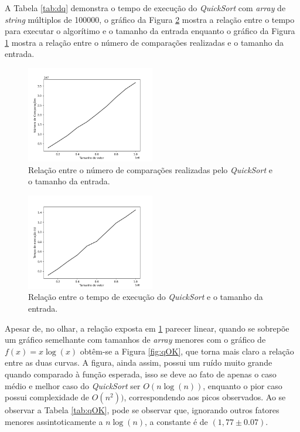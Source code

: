 \documentclass[12pt,a4paper,oneside]{article}
\begin{document}
\quad A Tabela \ref{tab:dq} demonstra o tempo de execução do \textit{QuickSort} com \textit{array} de \textit{string} múltiplos de 100000, o gráfico da Figura \ref{fig:tq} mostra a relação entre o tempo para executar o algorítimo e o tamanho da entrada enquanto o gráfico da Figura \ref{fig:nq} mostra a relação entre o número de comparações realizadas e o tamanho da entrada.

\begin{figure}[H]
\begin{center}
    \includegraphics[width=0.5\textwidth]{FigNQ.png} 
\end{center}
\caption{Relação entre o número de comparações realizadas pelo \textit{QuickSort} e o tamanho da entrada.}
\label{fig:nq}
\end{figure}

\begin{figure}[H]
\begin{center}
    \includegraphics[width=0.5\textwidth]{FigTQ.png} 
\end{center}
\caption{Relação entre o tempo de execução do \textit{QuickSort} e o tamanho da entrada.}
\label{fig:tq}
\end{figure}

\quad Apesar de, no olhar, a relação exposta em \ref{fig:nq} parecer linear, quando se sobrepõe um gráfico semelhante com tamanhos de \textit{array} menores com o gráfico de $f(x)=x\log{(x)}$ obtêm-se a Figura \ref{fig:qOK}, que torna mais claro a relação entre as duas curvas. A figura, ainda assim, possui um ruído muito grande quando comparado à função esperada, isso se deve ao fato de apenas o caso médio e melhor caso do \textit{QuickSort} ser $O(n\log{(n)})$, enquanto o pior caso possui complexidade de $O(n^2))$, correspondendo aos picos observados. Ao se observar a Tabela \ref{tab:qOK}, pode se observar que, ignorando outros fatores menores assintoticamente a $n\log(n)$, a constante é de $(1,77\pm 0.07)$.
\end{document}
